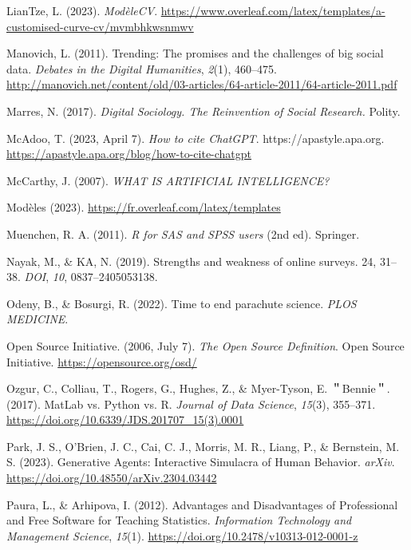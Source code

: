 \documentclass[
  letterpaper,
  DIV=11,
  numbers=noendperiod]{scrreprt}
\newlength{\cslhangindent}
\newenvironment{CSLReferences}[2] %
 {\begin{list}{}{%
  \setlength{\itemindent}{0pt}
  \setlength{\leftmargin}{0pt}
  \setlength{\parsep}{0pt}
  \ifodd #1
   \setlength{\leftmargin}{\cslhangindent}
   \setlength{\itemindent}{-1\cslhangindent}
  \fi
  \setlength{\itemsep}{#2\baselineskip}}}
 {\end{list}}
\begin{document}
\begin{CSLReferences}{1}{0}
LianTze, L. (2023). \emph{{ModèleCV}}.
\url{https://www.overleaf.com/latex/templates/a-customised-curve-cv/mvmbhkwsnmwv}

Manovich, L. (2011). Trending: {The} promises and the challenges of big
social data. \emph{Debates in the Digital Humanities}, \emph{2}(1),
460--475.
\url{http://manovich.net/content/old/03-articles/64-article-2011/64-article-2011.pdf}

Marres, N. (2017). \emph{Digital {Sociology}. {The Reinvention} of
{Social Research}.} Polity.

McAdoo, T. (2023, April 7). \emph{How to cite {ChatGPT}}.
https://apastyle.apa.org.
\url{https://apastyle.apa.org/blog/how-to-cite-chatgpt}

McCarthy, J. (2007). \emph{{WHAT IS ARTIFICIAL INTELLIGENCE}?}

Modèles (2023). \url{https://fr.overleaf.com/latex/templates}

Muenchen, R. A. (2011). \emph{R for {SAS} and {SPSS} users} (2nd ed).
Springer.

Nayak, M., \& KA, N. (2019). Strengths and weakness of online surveys.
24, 31--38. \emph{DOI}, \emph{10}, 0837--2405053138.

Odeny, B., \& Bosurgi, R. (2022). Time to end parachute science.
\emph{PLOS MEDICINE}.

Open Source Initiative. (2006, July 7). \emph{The {Open Source
Definition}}. Open Source Initiative. \url{https://opensource.org/osd/}

Ozgur, C., Colliau, T., Rogers, G., Hughes, Z., \& Myer-Tyson, E.
＂Bennie＂. (2017). {MatLab} vs. {Python} vs. {R}. \emph{Journal of Data
Science}, \emph{15}(3), 355--371.
\url{https://doi.org/10.6339/JDS.201707_15(3).0001}

Park, J. S., O'Brien, J. C., Cai, C. J., Morris, M. R., Liang, P., \&
Bernstein, M. S. (2023). Generative {Agents}: {Interactive Simulacra} of
{Human Behavior}. \emph{arXiv}.
\url{https://doi.org/10.48550/arXiv.2304.03442}

Paura, L., \& Arhipova, I. (2012). Advantages and {Disadvantages} of
{Professional} and {Free Software} for {Teaching Statistics}.
\emph{Information Technology and Management Science}, \emph{15}(1).
\url{https://doi.org/10.2478/v10313-012-0001-z}


\end{CSLReferences}
\end{document}
